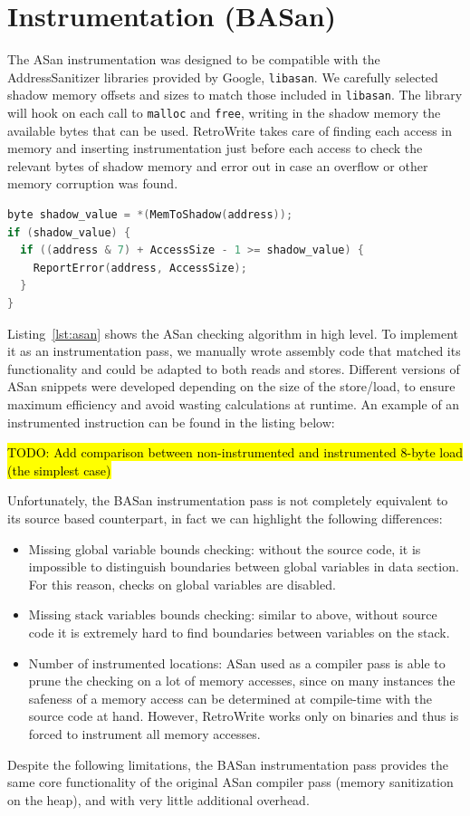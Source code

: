 \documentclass[a4paper,11pt,oneside]{report}
\newcommand{\sysname}{RetroWrite\xspace}
\DeclareRobustCommand{\todo}[1]{{\sethlcolor{cyan}\hl{TODO: #1}}}
\begin{document}
\section{Instrumentation (BASan)}
The ASan instrumentation was designed to be compatible with the 
AddressSanitizer libraries provided by Google, \texttt{libasan}. We carefully 
selected shadow memory offsets and sizes to match those included in 
\texttt{libasan}.  The library will hook on each call to \texttt{malloc} and 
\texttt{free}, writing in the shadow memory the available bytes that can be 
used. \sysname takes care of finding each access in memory and inserting 
instrumentation just before each access to check the relevant bytes of shadow 
memory and error out in case an overflow or other memory corruption was found.


\begin{lstlisting}[float,floatplacement=H,language=C,label={lst:asan},caption={ASan checking algorithm 
implemented in C}]
byte shadow_value = *(MemToShadow(address));
if (shadow_value) {
  if ((address & 7) + AccessSize - 1 >= shadow_value) {
	ReportError(address, AccessSize);
  }
}
\end{lstlisting}

Listing~\ref{lst:asan} shows the ASan checking algorithm in high level. To 
implement it as an instrumentation pass, we manually wrote assembly code that 
matched its functionality and could be adapted to both reads and stores.  
Different versions of ASan snippets were developed depending on the size of the 
store/load, to ensure maximum efficiency and avoid wasting calculations at 
runtime. An example of an instrumented instruction can be found in the listing 
below:

\todo{Add comparison between non-instrumented and instrumented 8-byte load (the 
simplest case)}

Unfortunately, the BASan instrumentation pass is not completely equivalent to 
its source based counterpart, in fact we can highlight the following 
differences:
\begin{itemize}
	\item Missing global variable bounds checking: without the source code, it 
		is impossible to distinguish boundaries between global variables in 
		data section. For this reason, checks on global variables are disabled.
	\item Missing stack variables bounds checking: similar to above, without 
		source code it is extremely hard to find boundaries between variables 
		on the stack.
	\item Number of instrumented locations: ASan used as a compiler pass is 
		able to prune the checking on a lot of memory accesses, since on many 
		instances the safeness of a memory access can be determined at 
		compile-time with the source code at hand. However, \sysname works only 
		on binaries and thus is forced to instrument all memory accesses.
\end{itemize}
Despite the following limitations, the BASan instrumentation pass provides the 
same core functionality of the original ASan compiler pass (memory sanitization 
on the heap), and with very little additional overhead.
\end{document}

